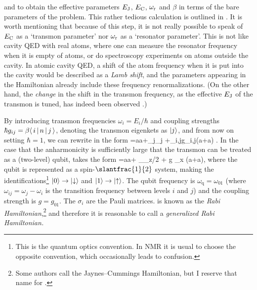 and to obtain the effective parameters $E_{\text{J}}$, $E_{\text{C}}$, $\omega_{\text{r}}$ and $\beta$ in terms of the bare parameters of the problem. This rather tedious calculation is outlined in \cite[appendix~A\@]{koch_charge-insensitive_2007}. It is worth mentioning that because of this step, it is not really possible to speak of $E_{\text{C}}$ as a `transmon parameter' nor $\omega_{\text{r}}$ as a `resonator parameter'. This is not like cavity QED with real atoms, where one can measure the resonator frequency when it is empty of atoms, or do spectroscopy experiments on atoms outside the cavity. In atomic cavity QED, a shift of the atom frequency when it is put into the cavity would be described as a \emph{Lamb shift}, and the parameters appearing in the Hamiltonian  already include these frequency renormalizations. (On the other hand, the \emph{change} in the shift in the transmon frequency, as the effective $E_{\text{J}}$ of the transmon is tuned, has indeed been observed \cite{wallraff_lambshift}.)

By introducing transmon frequencies $\omega_i=E_i/\hbar$ and coupling strengths $\hbar g_{ij}=\beta \langle\, i \,|\, {n} \,|\, j \,\rangle$, denoting the transmon eigenkets as $\left\lvert j \right\rangle$, and from now on setting $\hbar=1$, we can rewrite  in the form
\be
    \label{eq:genrabiham2}
    =\omr a\dg a+\sum_j\omega_j
        +\sum_{i,j}g_{i,j}(a+a\dg) .
\ee%
%
%
In the case that the anharmonicity is sufficiently large that the transmon can be treated as a (two-level) qubit,  takes the form
\be
    \label{eq:rabiham}
    =\omr a\dg a+ \omega_\sigma_z/2 +  g \sigma_x (a+a\dg),
\ee
where the qubit is represented as a spin-$\slantfrac{1}{2}$ system, making the identifications\footnote{This is the quantum optics convention. In NMR it is usual to choose the opposite convention, which occasionally leads to confusion.} $\left\lvert 0 \right\rangle\to\left\lvert \downarrow \right\rangle$ and $\left\lvert 1 \right\rangle\to\left\lvert \uparrow \right\rangle$. The qubit frequency is $\omega_\text{q}=\omega_{01}$ (where $\omega_{ij}=\omega_j-\omega_i$ is the transition frequency between levels $i$ and $j$) and the coupling strength is $g=g_{01}$.%
The $\sigma_i$ are the Pauli matrices.  is known as the \emph{Rabi Hamiltonian},\footnote{Some authors call  the Jaynes--Cummings Hamiltonian, but I reserve that name for .} and therefore it is reasonable to call  a \emph{generalized Rabi Hamiltonian.}%

